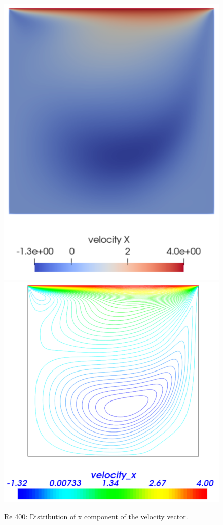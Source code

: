 \begin{figure}[H]
\centering
\includegraphics[scale=0.28]{DC_velocity_x}
\includegraphics[scale=0.35]{DC_velocity_x_VTK}
\caption{Re 400: Distribution of x component of the velocity vector.}\label{fg:DC_velocity_x}
\end{figure} 

